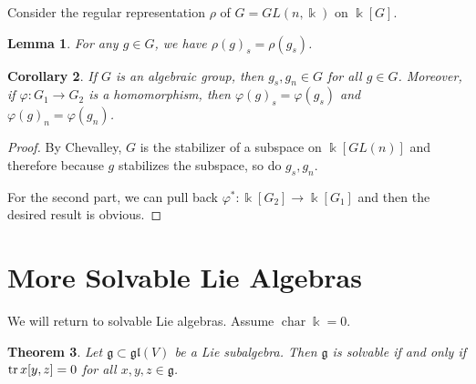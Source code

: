 \documentclass[leqno, openany]{memoir}
\newtheorem{thm}{Theorem}[section]
\newtheorem{cor}[thm]{Corollary}
\newtheorem{lem}[thm]{Lemma}
\theoremstyle{definition}
\theoremstyle{remark}
\theoremstyle{plain}
\theoremstyle{definition}
\theoremstyle{remark}
\renewcommand{\k}{\Bbbk}
\newcommand{\mf}[1]{\mathfrak{#1}}
\DeclareMathOperator{\chr}{char}
\begin{document}
Consider the regular representation $\rho$ of $G = GL(n, \k)$ on $\k[G]$.

\begin{lem}
    For any $g \in G$, we have ${\rho(g)}_s = \rho(g_s)$. 
\end{lem}

\begin{cor}
    If $G$ is an algebraic group, then $g_s, g_n \in G$ for all $g \in G$. Moreover, if $\varphi \colon G_1 \to G_2$ is a homomorphism, then ${ \varphi(g) }_s = \varphi(g_s)$ and ${\varphi(g)}_n = \varphi(g_n)$.
\end{cor}

\begin{proof}
    By Chevalley, $G$ is the stabilizer of a subspace on $\k[GL(n)]$ and therefore because $g$ stabilizes the subspace, so do $g_s, g_n$.

    For the second part, we can pull back $\varphi^* \colon \k[G_2] \to \k[G_1]$ and then the desired result is obvious.
\end{proof}

\section{More Solvable Lie Algebras}%
\label{sec:more_solvable_lie_algebras}

We will return to solvable Lie algebras. Assume $\chr \k = 0$.

\begin{thm}
    Let $\mf{g} \subset \mf{gl}(V)$ be a Lie subalgebra. Then $\mf{g}$ is solvable if and only if $\trace x[y,z] = 0$ for all $x,y,z \in \mf{g}$.
\end{thm}
\end{document}
